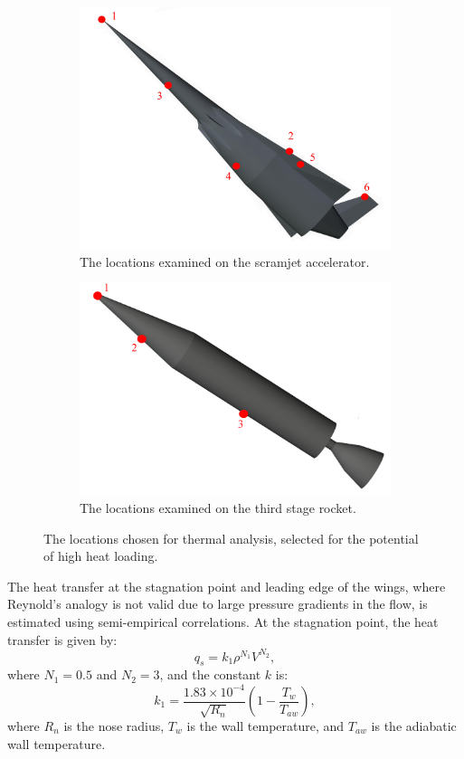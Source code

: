 \begin{figure}[!ht]
	
	\begin{subfigure}{.5\textwidth}
		\centering
		\includegraphics[width=0.9\linewidth]{figures/A1_uncertainty-analysis/Q_pos}
		\caption{The locations examined on the scramjet accelerator.}
	\end{subfigure}
	\begin{subfigure}{.5\textwidth}
		\centering
		\includegraphics[width=0.9\linewidth]{figures/A1_uncertainty-analysis/Q_pos3}
		\caption{The locations examined on the third stage rocket.}
	\end{subfigure}
	\caption{The locations chosen for thermal analysis, selected for the potential of high heat loading.}
	\label{fig:Q_pos}
\end{figure}

The heat transfer at the stagnation point and leading edge of the wings, where Reynold's analogy is not valid due to large pressure gradients in the flow\cite{HypersonicGas}, is estimated using semi-empirical correlations\cite{Dirkx}. At the stagnation point, the heat transfer is given by\cite{Dirkx}:
\begin{equation}
q_s = k_1\rho^{N_1}V^{N_2},
\end{equation}
where $N_1 = 0.5$ and $N_2 = 3$, and the constant $k$ is\cite{Dirkx}:
\begin{equation}
k_1 = \frac{1.83 \times 10^{-4}}{\sqrt{R_n}}(1-\frac{T_w}{T_{aw}}),
\end{equation}
where $R_n$ is the nose radius, $T_w$ is the wall temperature, and $T_{aw}$ is the adiabatic wall temperature.

